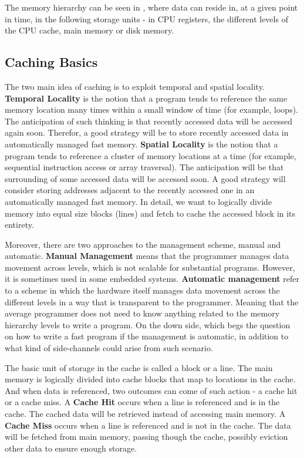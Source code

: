 The memory hierarchy can be seen in , where data can reside
in, at a given point in time, in the following storage units - in CPU registers,
the different levels of the CPU cache, main memory or disk memory. 

\subsection{Caching Basics}
\label{subsec:cachingbasics}
The two main idea of caching is to exploit temporal and spatial locality.
\textbf{Temporal Locality} is the notion that a program tends to reference the
same memory location many times within a small window of time (for example,
loops). The anticipation of such thinking is that recently accessed data will be
accessed again soon. Therefor, a good strategy will be to store recently
accessed data in automatically managed fast memory. \textbf{Spatial Locality} is
the notion that a program tends to reference a cluster of memory locations at a
time (for example, sequential instruction access or array traversal). The
anticipation will be that surrounding of some accessed data will be accessed
soon. A good strategy will consider storing addresses adjacent to the recently
accessed one in an automatically managed fast memory. In detail, we want to
logically divide memory into equal size blocks (lines) and fetch to cache the
accessed block in its entirety.   

Moreover, there are two approaches to the management scheme, manual and
automatic. \textbf{Manual Management} means that the programmer manages data
movement across levels, which is not scalable for substantial programs. However,
it is sometimes used in some embedded systems. \textbf{Automatic management}
refer to a scheme in which the hardware itself manages data movement across the
different levels in a way that is transparent to the programmer. Meaning that
the average programmer does not need to know anything related to the memory
hierarchy levels to write a program. On the down side, which begs the question
on how to write a fast program if the management is automatic, in addition to
what kind of side-channels could arise from such scenario.

The basic unit of storage in the cache is called a block or a line. The main
memory is logically divided into cache blocks that map to locations in the
cache. And when data is referenced, two outcomes can come of such action - a
cache hit or a cache miss. A \textbf{Cache Hit} occurs when a line is referenced
and is in the cache. The cached data will be retrieved instead of accessing main
memory.  A \textbf{Cache Miss} occurs when a line is referenced and is not in
the cache. The data will be fetched from main memory, passing though the cache,
possibly eviction other data to ensure enough storage.

